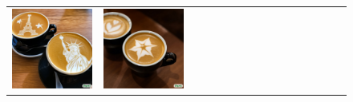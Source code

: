 \begin{figure}[ht!]
\begin{adjustwidth}{-0.8in}{-0.5in}
\begin{tabular}{cccccccccccccccccccc}
\multicolumn{3}{c}{\includegraphics[width=\twobytwocolwidth\textwidth]{figures/cherries/latte_0.jpg}} &
\multicolumn{3}{c}{\includegraphics[width=\twobytwocolwidth\textwidth]{figures/cherries/latte_1.jpg}} \\

\end{tabular}
\end{adjustwidth}
\end{figure}
